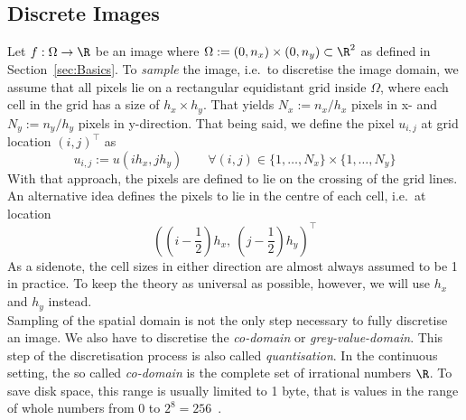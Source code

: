 \subsection{Discrete Images}\label{sub:DiscreteImages}
Let $f:\Omega \rightarrow \R$ be an image where $\Omega
:= (0, n_x)\times(0, n_y) \subset \R^2$ as defined in Section~\ref{sec:Basics}. To
\textit{sample} the image, i.e.\ to discretise the image domain, we assume that all pixels lie on a
rectangular equidistant grid inside $\Omega$, where each cell in the grid has a size of $h_x
\times h_y$.\newpage\noindent
That yields $N_x := n_x/h_x$ pixels in x- and $N_y := n_y/h_y$ pixels in
y-direction.
That being said, we define the pixel $u_{i,j}$ at grid location ${(i, j)}^\top$ as
\begin{equation}
    u_{i, j} := u(ih_x, jh_y)\qquad \forall(i ,j) \in \{1,\dots,N_x\}\times\{1,\dots,N_y\}
\end{equation}
With that approach, the pixels are defined to lie on the crossing of the grid lines.
An alternative idea defines the pixels to lie in the centre of each cell, i.e.\ at location 
\begin{equation}
    {\left(\left(i-\frac{1}{2}\right)h_x,\ \left(j- \frac{1}{2}\right)h_y\right)}^\top
\end{equation}
As a sidenote, the cell sizes in either direction are almost always assumed to be 1 in 
practice. 
To keep the theory as universal as possible, however, we will use $h_x$ and $h_y$ instead.\\
Sampling of the spatial domain is not the only step necessary to fully discretise an image. We also have
to discretise the \textit{co-domain} or \textit{grey-value-domain}. This step of
the discretisation process is also called \textit{quantisation}. In the continuous setting, the so
called \textit{co-domain} is the complete set of irrational numbers $\R$. To save disk space, this
range is usually limited to 1 byte, that is values in the range of whole numbers from 0 to
$2^8=256$~\cite{ipcv}.

